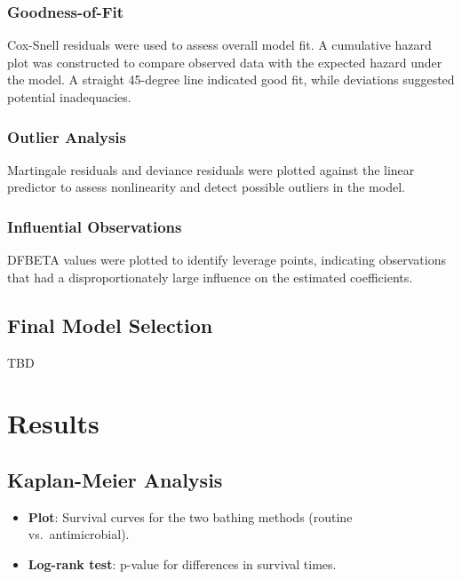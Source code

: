 \documentclass[12pt]{article}
\providecommand{\tightlist}{%
  \setlength{\itemsep}{0pt}\setlength{\parskip}{0pt}}
\begin{document}
\subsubsection{\texorpdfstring{\textbf{Goodness-of-Fit}}{Goodness-of-Fit}}\label{goodness-of-fit}

Cox-Snell residuals were used to assess overall model fit. A cumulative
hazard plot was constructed to compare observed data with the expected
hazard under the model. A straight 45-degree line indicated good fit,
while deviations suggested potential inadequacies.

\subsubsection{\texorpdfstring{\textbf{Outlier
Analysis}}{Outlier Analysis}}\label{outlier-analysis}

Martingale residuals and deviance residuals were plotted against the
linear predictor to assess nonlinearity and detect possible outliers in
the model.

\subsubsection{\texorpdfstring{\textbf{Influential
Observations}}{Influential Observations}}\label{influential-observations}

DFBETA values were plotted to identify leverage points, indicating
observations that had a disproportionately large influence on the
estimated coefficients.

\subsection{\texorpdfstring{\textbf{Final Model
Selection}}{Final Model Selection}}\label{final-model-selection}

TBD

\section{Results}\label{results}

\subsection{Kaplan-Meier Analysis}\label{kaplan-meier-analysis}

\begin{itemize}
\tightlist
\item
  \textbf{Plot}: Survival curves for the two bathing methods (routine
  vs.~antimicrobial).
\item
  \textbf{Log-rank test}: p-value for differences in survival times.
\end{itemize}
\end{document}
